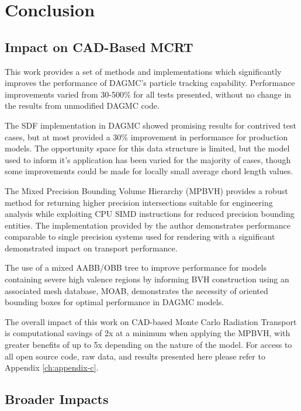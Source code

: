 
\chapter{Conclusion}\label{ch:conclusion}

\section{Impact on CAD-Based MCRT}

This work provides a set of methods and implementations which significantly
improves the performance of DAGMC's particle tracking capability. Performance
improvements varied from 30-500\% for all tests presented, without no change in
the results from unmodified DAGMC code.

The SDF implementation in DAGMC showed promising results for contrived test
cases, but at most provided a 30\% improvement in performance for production
models. The opportunity space for this data structure is limited, but the model
used to inform it's application has been varied for the majority of cases,
though some improvements could be made for locally small average chord length
values.

The Mixed Precision Bounding Volume Hierarchy (MPBVH) provides a robust method
for returning higher precision intersections suitable for engineering analysis
while exploiting CPU SIMD instructions for reduced precision bounding
entities. The implementation provided by the author demonstrates performance
comparable to single precision systems used for rendering with a significant
demonstrated impact on transport performance.

The use of a mixed AABB/OBB tree to improve performance for models containing
severe high valence regions by informing BVH construction using an associated
mesh database, MOAB, demonstrates the necessity of oriented bounding boxes for
optimal performance in DAGMC models.

The overall impact of this work on CAD-based Monte Carlo Radiation Transport is
computational savings of 2x at a minimum when applying the MPBVH, with greater
benefits of up to 5x depending on the nature of the model. For access to all
open source code, raw data, and results presented here please refer to Appendix
\ref{ch:appendix-c}.

\section{Broader Impacts}\label{sec:other_contrib}


